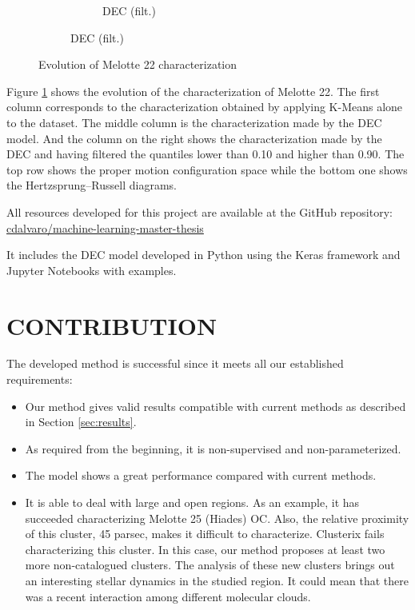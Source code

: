 \documentclass[11pt,a4paper,english,twocolumn]{article}
\begin{document}
\begin{figure}[htbp]
\begin{subfigure}{\columnwidth}
\begin{subfigure}[t]{0.3\textwidth}
      \caption{DEC (filt.)}
    \end{subfigure}
  \end{subfigure}
  \caption{Evolution of Melotte 22 characterization}
  \label{fig:melotte_22_characterization_evolution}
\end{figure}

Figure \ref{fig:melotte_22_characterization_evolution} shows the evolution
of the characterization of Melotte 22. The first column corresponds to the
characterization obtained by applying K-Means alone to the dataset. The middle
column is the characterization made by the DEC model. And the column on the right
shows the characterization made by the DEC and having filtered the quantiles
lower than 0.10 and higher than 0.90. The top row shows the proper motion
configuration space while the bottom one shows the Hertzsprung–Russell diagrams.

All resources developed for this project are available at the GitHub repository:
\href{https://github.com/cdalvaro/machine-learning-master-thesis}{cdalvaro/machine-learning-master-thesis}

It includes the DEC model developed in Python using the Keras framework
and Jupyter Notebooks \cite{Kluyver2016jupyter} with examples.

\section{CONTRIBUTION}

The developed method is successful since it meets all our established requirements:

\begin{itemize}
  \item Our method gives valid results compatible with current methods as described in Section \ref{sec:results}.
  \item As required from the beginning, it is non-supervised and non-parameterized.
  \item The model shows a great performance compared with current methods.
  \item It is able to deal with large and open regions. As an example,
        it has succeeded characterizing Melotte 25 (Hiades) OC. Also,
        the relative proximity of this cluster, 45 parsec, makes it difficult to
        characterize. Clusterix fails characterizing this cluster. In this case,
        our method proposes at least two more non-catalogued clusters. The analysis
        of these new clusters brings out an interesting stellar dynamics in the studied
        region. It could mean that there was a recent interaction among different molecular clouds.
\end{itemize}
\end{document}
